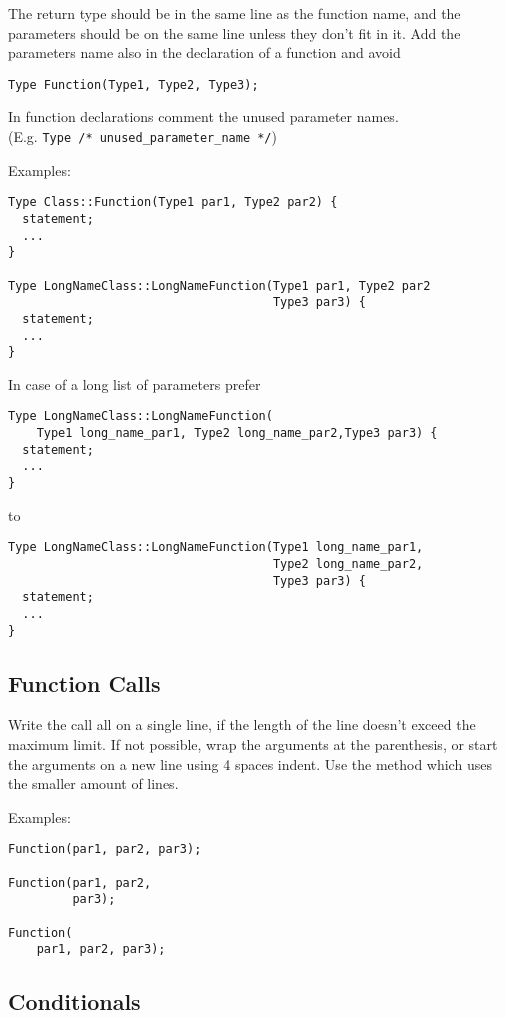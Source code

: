 \documentclass[a4paper]{article}
\newcommand{\inlinecode}[1]{\lstinline|#1|}
\begin{document}
The return type should be in the same line as the function name, and the parameters should be on the same line unless they don't fit in it.
Add the parameters name also in the declaration of a function and avoid
\begin{lstlisting}
Type Function(Type1, Type2, Type3);
\end{lstlisting}
In function declarations comment the unused parameter names. \\(E.g. \inlinecode{Type /* unused_parameter_name */})

Examples:
\begin{lstlisting}
Type Class::Function(Type1 par1, Type2 par2) {
  statement;
  ...
}

Type LongNameClass::LongNameFunction(Type1 par1, Type2 par2
                                     Type3 par3) {
  statement;
  ...
}
\end{lstlisting}

In case of a long list of parameters prefer
\begin{lstlisting}
Type LongNameClass::LongNameFunction(
    Type1 long_name_par1, Type2 long_name_par2,Type3 par3) {
  statement;
  ...
}
\end{lstlisting}
to
\begin{lstlisting}
Type LongNameClass::LongNameFunction(Type1 long_name_par1,
                                     Type2 long_name_par2,
                                     Type3 par3) {
  statement;
  ...
}
\end{lstlisting}

\subsection{Function Calls}

Write the call all on a single line, if the length of the line doesn't exceed the maximum limit.
If not possible, wrap the arguments at the parenthesis, or start the arguments on a new line using 4 spaces indent.
Use the method which uses the smaller amount of lines.

Examples:
\begin{lstlisting}
Function(par1, par2, par3);

Function(par1, par2,
         par3);

Function(
    par1, par2, par3);
\end{lstlisting}

\subsection{Conditionals}
\end{document}
